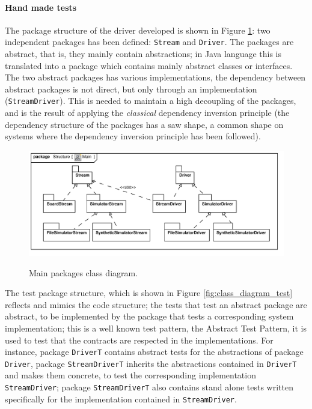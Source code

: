 \documentclass{article} \usepackage{times}
\newcommand{\lil}[1]{\texttt{\lstinline|#1|}}
\begin{document}
\paragraph*{Hand made tests}

The package structure of the driver developed is shown in Figure
\ref{fig:class_diagram_main}: two independent packages has been
defined: \lil{Stream} and \lil{Driver}.  The packages are abstract,
that is, they mainly contain abstractions; in Java language this is
translated into a package which contains mainly abstract classes or
interfaces.  The two abstract packages has various implementations,
the dependency between abstract packages is not direct, but only
through an implementation (\lil{StreamDriver}).  This is needed to
maintain a high decoupling of the packages, and is the result of
applying the \emph{classical} dependency inversion
principle\cite{martin1996dependency} (the dependency structure of the
packages has a saw shape, a common shape on systems where the
dependency inversion principle has been followed).

\begin{figure}[htb!]
  \centering
  \includegraphics[scale=0.7]{UML_model/Class_Diagram__Structure__Main}
  \label{fig:class_diagram_main}
  \caption{Main packages class diagram.}
\end{figure}

The test package structure, which is shown in Figure
\ref{fig:class_diagram_test} reflects and mimics the code structure;
the tests that test an abstract package are abstract, to be
implemented by the package that tests a corresponding system
implementation; this is a well known test pattern, the Abstract Test
Pattern\cite{thomas2004java}, it is used to test that the contracts
are respected in the implementations.  For instance, package
\lil{DriverT} contains abstract tests for the abstractions of package
\lil{Driver}, package \lil{StreamDriverT} inherits the abstractions
contained in \lil{DriverT} and makes them concrete, to test the
corresponding implementation \lil{StreamDriver}; package
\lil{StreamDriverT} also contains stand alone tests written
specifically for the implementation contained in \lil{StreamDriver}.
\end{document}
